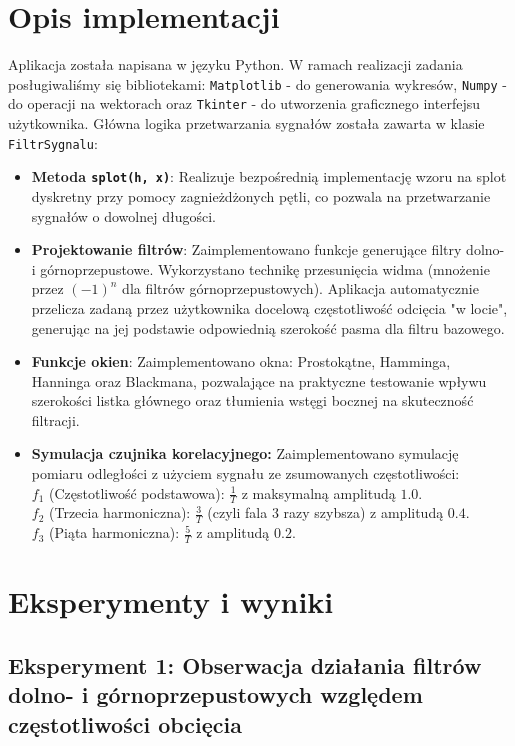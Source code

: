 \documentclass[12pt]{article}
\begin{document}
\section{Opis implementacji}
Aplikacja została napisana w języku Python. W ramach realizacji zadania posługiwaliśmy się bibliotekami: \verb|Matplotlib| - do generowania wykresów, \verb|Numpy| - do operacji na wektorach oraz \verb|Tkinter| - do utworzenia graficznego interfejsu użytkownika.
Główna logika przetwarzania sygnałów została zawarta w klasie \verb|FiltrSygnalu|:
\begin{itemize}
    \item \textbf{Metoda \texttt{splot(h, x)}}: Realizuje bezpośrednią implementację wzoru na splot dyskretny przy pomocy zagnieżdżonych pętli, co pozwala na przetwarzanie sygnałów o dowolnej długości.
    \item \textbf{Projektowanie filtrów}: Zaimplementowano funkcje generujące filtry dolno- i górnoprzepustowe. Wykorzystano technikę przesunięcia widma (mnożenie przez $(-1)^n$ dla filtrów górnoprzepustowych). Aplikacja automatycznie przelicza zadaną przez użytkownika docelową częstotliwość odcięcia "w locie", generując na jej podstawie odpowiednią szerokość pasma dla filtru bazowego.
    \item \textbf{Funkcje okien}: Zaimplementowano okna: Prostokątne, Hamminga, Hanninga oraz Blackmana, pozwalające na praktyczne testowanie wpływu szerokości listka głównego oraz tłumienia wstęgi bocznej na skuteczność filtracji.
    \item \textbf{Symulacja czujnika korelacyjnego:} Zaimplementowano symulację pomiaru odległości z użyciem sygnału ze zsumowanych częstotliwości:\\
    $f_1$ (Częstotliwość podstawowa): $\frac{1}{T}$ z maksymalną amplitudą $1.0$.\\
    $f_2$ (Trzecia harmoniczna): $\frac{3}{T}$ (czyli fala 3 razy szybsza) z amplitudą $0.4$.\\
    $f_3$ (Piąta harmoniczna): $\frac{5}{T}$ z amplitudą $0.2$.
\end{itemize}

\section{Eksperymenty i wyniki}
\subsection{Eksperyment 1: Obserwacja działania filtrów dolno- i górnoprzepustowych względem częstotliwości obcięcia}
\end{document}
